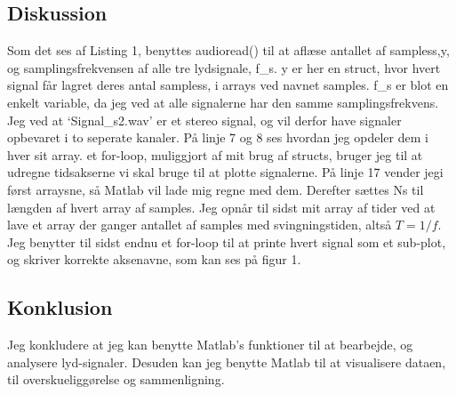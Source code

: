 \documentclass[../main.tex]{subfiles}
\begin{document}
\subsection{Diskussion}
Som det ses af Listing 1, benyttes audioread() til at aflæse antallet af sampless,y, og samplingsfrekvensen af alle tre lydsignale, f\_s. y er her en struct, hvor hvert signal får lagret deres antal sampless, i arrays ved navnet samples. f\_s er blot en enkelt variable, da jeg ved at alle signalerne har den samme samplingsfrekvens.\vspace{0.5cm}
Jeg ved at `Signal\_s2.wav' er et stereo signal, og vil derfor have signaler opbevaret i to seperate kanaler. På linje 7 og 8 ses hvordan jeg opdeler dem i hver sit array. et for-loop, muliggjort af mit brug af structs, bruger jeg til at udregne tidsakserne vi skal bruge til at plotte signalerne. På linje 17 vender jegi først arraysne, så Matlab vil lade mig regne med dem. Derefter sættes Ns til længden af hvert array af samples. Jeg opnår til sidst mit array af tider ved at lave et array der ganger antallet af samples med svingningstiden, altså $T = 1/f$.\vspace{0.5cm}
Jeg benytter til sidst endnu et for-loop til at printe hvert signal som et sub-plot, og skriver korrekte aksenavne, som kan ses på figur 1.

\subsection{Konklusion}
Jeg konkludere at jeg kan benytte Matlab's funktioner til at bearbejde, og analysere lyd-signaler. Desuden kan jeg benytte Matlab til at visualisere dataen, til overskueliggørelse og sammenligning.
\end{document}
